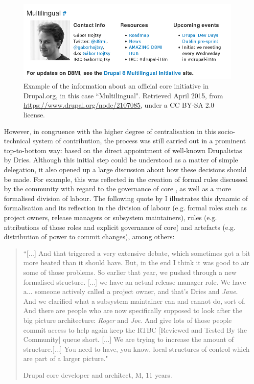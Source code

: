 \begin{figure}[H]
   \centering
   \includegraphics[scale=0.5]{img/online/core_initiative.png}
   \caption[Example of information about official core initiative in Drupal.org]%
   {Example of the information about an official core initiative in Drupal.org, in this case ``Multilingual". Retrieved  April 2015, from \url{https://www.drupal.org/node/2107085}, under a CC BY-SA 2.0 license.}
\label{core-initiative}
\end{figure}

However, in congruence with the higher degree of centralisation in this socio-technical system of contribution, the process was still carried out in a prominent top-to-bottom way: based on the direct appointment of well-known Drupalistas by Dries. Although this initial step could be understood as a matter of simple delegation, it also opened up a large discussion about how these decisions should be made. For example, this was reflected in the creation of formal rules discussed by the community with regard to the governance of core \parencite{drupalorg-core-governance:2016:Online}, as well as a more formalised division of labour. The following quote by I illustrates this dynamic of formalisation and its reflection in the division of labour (e.g. formal roles such as project owners, release managers or subsystem maintainers), rules (e.g. attributions of those roles and explicit governance of core) and artefacts (e.g. distribution of power to commit changes),  among others:

\begin{quotation}
``[...] And that triggered a very extensive debate, which sometimes got a bit more heated than it should have. But, in the end I think it was good to air some of those problems. So earlier that year, we pushed through a new formalised structure. [...] we have an actual release manager role. We have a... someone actively called a project owner, and that's Dries and \textit{Jane}. And we clarified what a subsystem maintainer can and cannot do, sort of. And there are people who are now specifically supposed to look after the big picture architecture: \textit{Roger} and \textit{Joe}. And give lots of those people commit access to help again keep the RTBC [Reviewed and Tested By the Community] queue short. [...] We are trying to increase the amount of structure.[...] You need to have, you know, local structures of control which are part of a larger picture."
\begin{flushright}\footnotesize{Drupal core developer and architect, M, 11 years.}\end{flushright}
\end{quotation}

